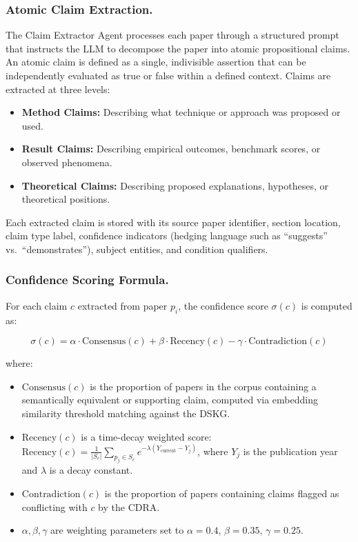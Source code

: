 \subsubsection{Atomic Claim Extraction.}
The Claim Extractor Agent processes each paper through a structured prompt that instructs the LLM to decompose the paper into atomic propositional claims. An atomic claim is defined as a single, indivisible assertion that can be independently evaluated as true or false within a defined context. Claims are extracted at three levels:

\begin{itemize}
    \item \textbf{Method Claims:} Describing what technique or approach was proposed or used.
    \item \textbf{Result Claims:} Describing empirical outcomes, benchmark scores, or observed phenomena.
    \item \textbf{Theoretical Claims:} Describing proposed explanations, hypotheses, or theoretical positions.
\end{itemize}

Each extracted claim is stored with its source paper identifier, section location, claim type label, confidence indicators (hedging language such as ``suggests'' vs.\ ``demonstrates''), subject entities, and condition qualifiers.

\subsubsection{Confidence Scoring Formula.}
For each claim $c$ extracted from paper $p_i$, the confidence score $\sigma(c)$ is computed as:

\begin{equation}\label{eq:cgcers}
\sigma(c) = \alpha \cdot \text{Consensus}(c) + \beta \cdot \text{Recency}(c) - \gamma \cdot \text{Contradiction}(c)
\end{equation}

\noindent where:
\begin{itemize}
    \item $\text{Consensus}(c)$ is the proportion of papers in the corpus containing a semantically equivalent or supporting claim, computed via embedding similarity threshold matching against the DSKG.
    \item $\text{Recency}(c)$ is a time-decay weighted score: $\text{Recency}(c) = \frac{1}{|S_c|}\sum_{p_j \in S_c} e^{-\lambda(Y_{\text{current}} - Y_j)}$, where $Y_j$ is the publication year and $\lambda$ is a decay constant.
    \item $\text{Contradiction}(c)$ is the proportion of papers containing claims flagged as conflicting with $c$ by the CDRA.
    \item $\alpha, \beta, \gamma$ are weighting parameters set to $\alpha=0.4$, $\beta=0.35$, $\gamma=0.25$.
\end{itemize}

